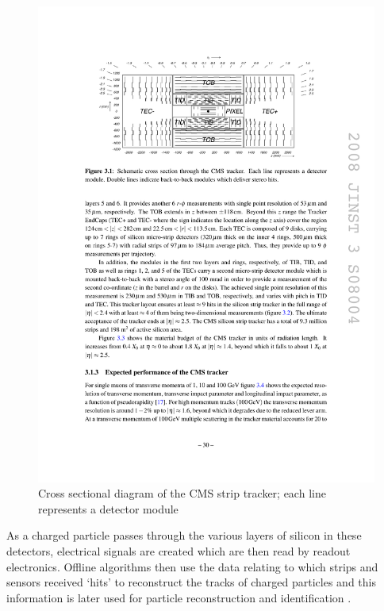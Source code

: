 \begin{figure}[hbtp]
   \centering
     \includegraphics[width=\textwidth]{Chapters/02_Detector/Images/tracker.pdf}\hfill
     \caption[Cross sectional diagram of the CMS strip tracker.]{Cross sectional diagram of the CMS strip
     tracker; each line represents a detector module
     \cite{CMS_TDR1}}
     \label{fig:CMS_strip_tracker}
\end{figure}

As a charged particle passes through the various layers of silicon in these detectors, electrical signals are
created which are then read by readout electronics. Offline algorithms then use the data relating to which
strips and sensors received `hits' to reconstruct the tracks of charged particles and this information is
later used for particle reconstruction and identification \cite{CMS_experiment,CMS_Tracking_Early_Results}.

